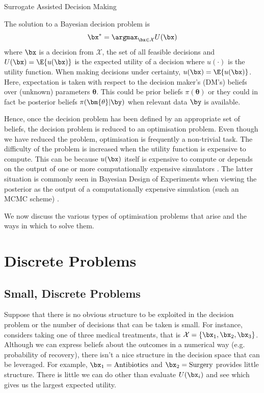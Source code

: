 
\begin{chapter}{Surrogate Assisted Decision Making \label{Chap:optimisation}}

The solution to a Bayesian decision problem is
\begin{equation}
  \bx^{*} = \argmax_{\bx \in \mathcal{X}} U(\bx)
\end{equation}
where $\bx$ is a decision from $\mathcal{X}$, the set of all feasible decisions and $U(\bx) = \E \{ u(\bx) \}$ is the expected utility of a decision where $u(\cdot)$ is the utility function. When making decisions under certainty, $u(\bx) = \E \{ u(\bx) \} $. Here, expectation is taken with respect to the decision maker's (DM's) beliefs over (unknown) parameters $\bm{\theta}$. This could be prior beliefs $\pi(\bm{\theta})$ or they could in fact be posterior beliefs $\pi(\bm{\theta} | \by)$ when relevant data $\by$ is available.

Hence, once the decision problem has been defined by an appropriate set of beliefs, the decision problem is reduced to an optimisation problem. Even though we have reduced the problem, optimisation is frequently a non-trivial task. The difficulty of the problem is increased when the utility function is expensive to compute. This can be because $u(\bx)$ itself is expensive to compute or depends on the output of one or more computationally expensive simulators \citep{Williamson2012}. The latter situation is commonly seen in Bayesian Design of Experiments when viewing the posterior as the output of a computationally expensive simulation (such an MCMC scheme) \citep{Ryan2016}.

We now discuss the various types of optimisation problems that arise and the ways in which to solve them.


\section{Discrete Problems}
\subsection{Small, Discrete Problems}
Suppose that there is no obvious structure to be exploited in the decision problem or the number of decisions that can be taken is small. For instance, \citet{Oakley2009} considers taking one of three medical treatments, that is $\mathcal{X} = \{ \bx_1, \bx_2, \bx_3\}$. Although we can express beliefs about the outcomes in a numerical way (e.g. probability of recovery), there isn't a nice structure in the decision space that can be leveraged. For example, $\bx_1 = \text{Antibiotics}$ and $\bx_2 = \text{Surgery}$ provides little structure. There is little we can do other than evaluate $U(\bx_i)$ and see which gives us the largest expected utility.


\end{chapter}
